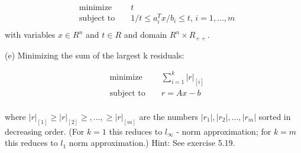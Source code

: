 \documentclass{article}
\begin{document}
\begin{align*}
&\text{minimize } && t \\
&\text{subject to } 
&& 1/t \leq a_i^Tx/b_i \leq t, \, i = 1 ,..., m\\
\end{align*} 
with variables $x \in R^n$ and $t \in R$ and domain $R^n \times R_{++}.$

(e) Minimizing the sum of the largest k residuals:

\begin{align*}
&\text{minimize } && 
\sum_{i = 1}^k |r|_{[i]} \\
&\text{subject to } 
&& r = Ax - b\\
\end{align*} 

where $|r|_{[1]} \geq |r|_{[2]} \geq ,..., 
\geq |r|_{[m]}$ are the numbers 
$|r_1|, |r_2|, ... , |r_m| $ sorted in decreasing order. (For $k = 1$ this reduces to $l_\infty$ - norm approximation; for $k = m$ this reduces to $l_1$ norm approximation.) Hint: See exercise 5.19.
\end{document}
